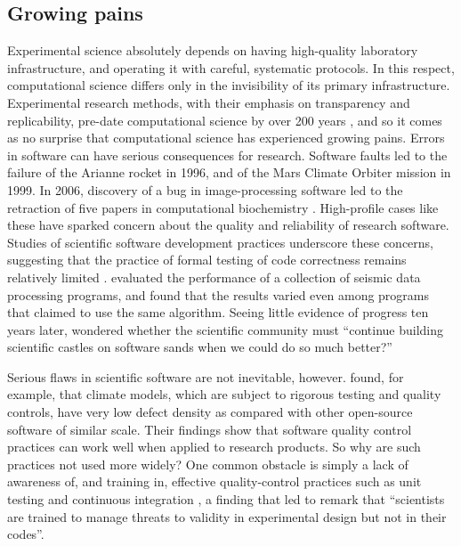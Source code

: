 \documentclass[journal abbreviation, manuscript]{copernicus}
\begin{document}
\subsection{Growing pains}

Experimental science absolutely depends on having high-quality laboratory infrastructure, and operating it with careful, systematic protocols. In this respect, computational science differs only in the invisibility of its primary infrastructure. Experimental research methods, with their emphasis on transparency and replicability, pre-date computational science by over 200 years \citep{wilson2006s,fomel2009reproducible}, and so it comes as no surprise that computational science has experienced growing pains. Errors in software can have serious consequences for research. Software faults led to the failure of the Arianne rocket in 1996, and of the Mars Climate Orbiter mission in 1999. In 2006, discovery of a bug in image-processing software led to the retraction of five papers in computational biochemistry \citep{miller2006scientist}. High-profile cases like these have sparked concern about the quality and reliability of research software. Studies of scientific software development practices underscore these concerns, suggesting that the practice of formal testing of code correctness remains relatively limited \citep{post2005computational,wilson2006s,hannay2009scientists,nguyen2010survey,clune2011software,howison2011scientific,prabhu2011survey,kanewala2014testing,heaton2015claims}. \citet{hatton1997t} evaluated the performance of a collection of seismic data processing programs, and found that the results varied even among programs that claimed to use the same algorithm. Seeing little evidence of progress ten years later, \citet{hatton2007chimera} wondered whether the scientific community must ``continue building scientific castles on software sands when we could do so much better?''

Serious flaws in scientific software are not inevitable, however. \citet{pipitone2012assessing} found, for example, that climate models, which are subject to rigorous testing and quality controls, have very low defect density as compared with other open-source software of similar scale. Their findings show that software quality control practices can work well when applied to research products. So why are such practices not used more widely? One common obstacle is simply a lack of awareness of, and training in, effective quality-control practices such as unit testing and continuous integration \citep{wilson2006s,faulk2009scientific,hannay2009scientists,kanewala2014testing}, a finding that led \citet{faulk2009scientific} to remark that ``scientists are trained to manage threats to validity in experimental design but not in their codes''.
\end{document}
